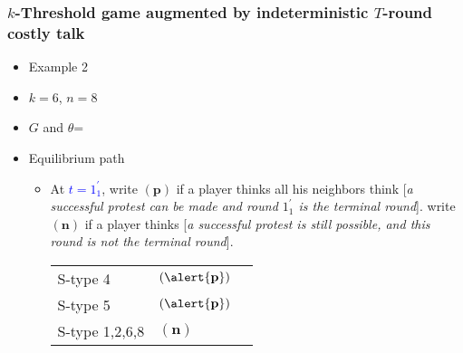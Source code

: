 \documentclass[9pt,handout]{beamer}
\begin{document}
\begin{frame}
  \frametitle{$k$-Threshold game augmented by indeterministic $T$-round costly talk}

\begin{itemize}
\item Example 2
\item $k=6$, $n=8$
\item $G$ and $\theta$=
\begin{center}
\end{center}
\end{itemize}

\begin{itemize}
\item Equilibrium path
\begin{itemize}
\item 
{
At \textcolor{blue}{$t=1^{'}_1$}, write $({\textbf{p}})$ if a player thinks all his neighbors think \alert{[}\textit{a successful protest can be made and round $1^{'}_1$ is the terminal round}\alert{]}. write $({\textbf{n}})$ if a player thinks \alert{[}\textit{a successful protest is still possible, and this round is not the terminal round}\alert{]}. 
\begin{table}[h]
\begin{tabular}{ll l}
S-type 4 & $(\alert{\textbf{p}})$\\
S-type 5 & $(\alert{\textbf{p}})$\\
S-type 1,2,6,8 & $(\textbf{n})$
\end{tabular}
\end{table}
}
\end{itemize}
\end{itemize}
\end{frame}
\end{document}
